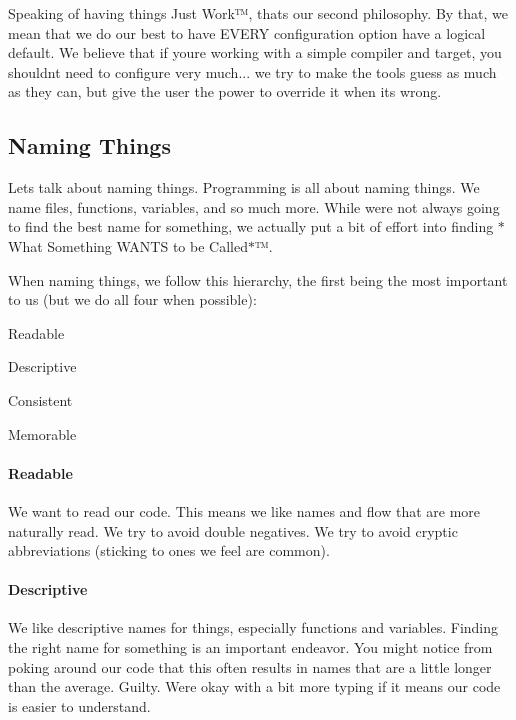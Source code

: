 Speaking of having things Just Work™, that\textquotesingle{}s our second philosophy. By that, we mean that we do our best to have E\+V\+E\+RY configuration option have a logical default. We believe that if you\textquotesingle{}re working with a simple compiler and target, you shouldn\textquotesingle{}t need to configure very much... we try to make the tools guess as much as they can, but give the user the power to override it when it\textquotesingle{}s wrong.

\subsection*{Naming Things}

Let\textquotesingle{}s talk about naming things. Programming is all about naming things. We name files, functions, variables, and so much more. While we\textquotesingle{}re not always going to find the best name for something, we actually put a bit of effort into finding $\ast$\+What Something W\+A\+N\+TS to be Called$\ast$™.

When naming things, we follow this hierarchy, the first being the most important to us (but we do all four when possible)\+:
\begin{DoxyEnumerate}
\item Readable
\item Descriptive
\item Consistent
\item Memorable
\end{DoxyEnumerate}

\paragraph*{Readable}

We want to read our code. This means we like names and flow that are more naturally read. We try to avoid double negatives. We try to avoid cryptic abbreviations (sticking to ones we feel are common).

\paragraph*{Descriptive}

We like descriptive names for things, especially functions and variables. Finding the right name for something is an important endeavor. You might notice from poking around our code that this often results in names that are a little longer than the average. Guilty. We\textquotesingle{}re okay with a bit more typing if it means our code is easier to understand.

